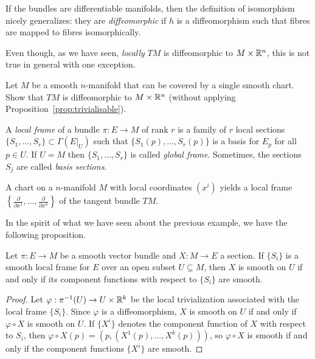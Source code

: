 If the bundles are differentiable manifolds, then the definition of isomorphism nicely generalizes: they are \emph{diffeomorphic} if $h$ is a diffeomorphism such that fibres are mapped to fibres isomorphically.

Even though, as we have seen, \emph{locally} $TM$ is diffeomorphic to $M\times\mathbb{R}^n$, this is not true in general with one exception.
\begin{exercise}\label{ex:trivialisable}
  Let $M$ be a smooth $n$-manifold that can be covered by a single smooth chart.
  Show that $TM$ is diffeomorphic to $M\times\mathbb{R}^n$ (without applying Proposition~\ref{prop:trivialisable}).
\end{exercise}

\begin{definition}
  A \emph{local frame} of a bundle $\pi:E\to M$ of rank $r$ is a family of $r$ local sections $\{S_1, \ldots, S_r\}\subset\Gamma(E|_U)$ such that $\{S_1(p), \ldots, S_r(p)\}$ is a basis for $E_p$ for all $p\in U$.
  If $U=M$ then $\{S_1, \ldots, S_r\}$ is called \emph{global frame}.
  Sometimes, the sections $S_j$ are called \emph{basis sections}.
\end{definition}

\begin{example}
  A chart on a $n$-manifold $M$ with local coordinates $(x^i)$ yields a local frame $\left\{\frac{\partial}{\partial x^1}, \ldots, \frac{\partial}{\partial x^n}\right\}$ of the tangent bundle $TM$.
\end{example}

In the spirit of what we have seen about the previous example, we have the following proposition.

\begin{proposition}
  Let $\pi:E \to M$ be a smooth vector bundle and $X:M\to E$ a section.
  If $\{S_i\}$ is a smooth local frame for $E$ over an open subset $U\subseteq M$, then $X$ is smooth on $U$ if and only if its component functions with respect to $\{S_i\}$ are smooth.
\end{proposition}
\begin{proof}
  Let $\varphi:\pi^{-1}(U) \to U\times\mathbb{R}^k$ be the local trivialization associated with the local frame $\{S_i\}$.
  Since $\varphi$ is a diffeomorphism, $X$ is smooth on $U$ if and only if $\varphi\circ X$ is smooth on $U$.
  If $\{X^i\}$ denotes the component function of $X$ with respect to $S_i$, then $\varphi\circ X (p) = (p, (X^1(p), \ldots, X^k(p)))$, so $\varphi\circ X$ is smooth if and only if the component functions $\{X^i\}$ are smooth.
\end{proof}

